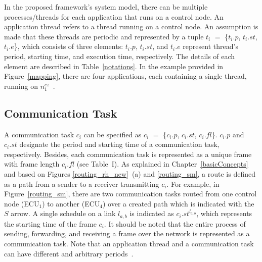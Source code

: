 In the proposed framework's system model, there can be multiple processes/threads for each application that runs on a control node. An application thread refers to a thread running on a control node. An assumption is made that these threads are periodic and represented by a tuple $t_i$ $=$ \{$t_i.p$, $t_i.st$, $t_i.e$\}, which consists of three elements: $t_i.p$, $t_i.st$, and $t_i.e$ represent thread's period, starting time, and execution time, respectively. The details of each element are described in Table~\ref{notations}. In the example provided in Figure~\ref{mapping}, there are four applications, each containing a single thread, running on $n_{1}^{cz}$~\cite{askaripoor2023designer}.






\subsection{Communication Task}
A communication task $c_i$ can be specified as $c_i$ $=$ \{$c_i.p$, $c_i.st$, $c_i.fl$\}. $c_i.p$ and $c_i.st$ designate the period and starting time of a communication task, respectively. Besides, each communication task is represented as a unique frame with  
frame length $c_i.fl$ (see Table~I). As explained in Chapter~\ref{basicConcepts} and based on Figures \ref{routing_rh_new}~(a) and \ref{routing_sm}, a route is defined as a path from a sender to a receiver transmitting $c_i$. For example, in Figure~\ref{routing_sm}, there are two communication tasks routed from one control node (ECU$_1$) to another (ECU$_4$) over a created path which is indicated with the $S$ arrow. 
A single schedule on a link $l_{a,b}$ is indicated as $c_i.st^{l_{a,b}}$, which represents the starting time of the frame $c_i$. 
It should be noted that the entire process of sending, forwarding, and receiving a frame over the network is represented as a communication task. Note that an application thread and a communication task can have different and arbitrary periods~\cite{askaripoor2023designer}. %



